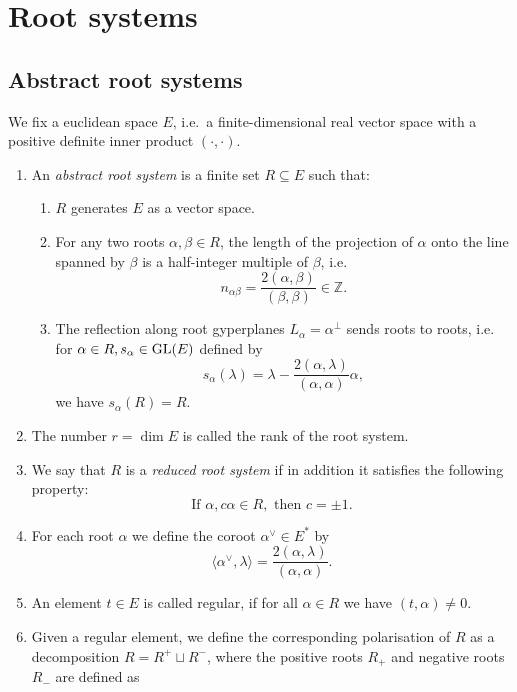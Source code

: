 \documentclass{report}
\begin{document}
\chapter{Root systems}
\section{Abstract root systems}
We fix a euclidean space $E$, i.e.\ a finite-dimensional real vector space with a positive definite inner product $(\cdot, \cdot)$.
\begin{definition}
    \begin{enumerate}
        \item An \emph{abstract root system} is a finite set $R \subseteq E$ such that:
        \begin{enumerate}[label = (\roman*)]
            \item $R$ generates $E$ as a vector space.
            \item For any two roots $\alpha, \beta \in R$, the length of the projection of $\alpha$ onto the line spanned by $\beta$ is a half-integer multiple of $\beta$, i.e.
            \[
            n_{\alpha \beta} = \frac{2(\alpha, \beta)}{(\beta, \beta)} \in \mathbb Z.
            \]
            \item The reflection along root gyperplanes $L_\alpha = \alpha^\perp$ sends roots to roots, i.e. for $\alpha \in R, s_\alpha \in \operatorname{{\mathrm{GL}}}(E)$ defined by
            \[
            s_{\alpha}(\lambda) = \lambda - \frac{2(\alpha, \lambda)}{(\alpha, \alpha)} \alpha,
            \]
            we have $s_\alpha(R) = R$.
        \end{enumerate}
        \item The number $r = \dim E$ is called the rank of the root system.
        \item We say that $R$ is a \emph{reduced root system} if in addition it satisfies the following property:
        \[ \text{If } \alpha, c \alpha \in R, \text{ then } c = \pm 1.\]
        \item For each root $\alpha$ we define the coroot $\alpha^\vee \in E^*$ by 
        \[
        \langle \alpha^\vee, \lambda \rangle = \frac{2(\alpha, \lambda)}{(\alpha, \alpha)}.
        \]
        \item An element $t \in E$ is called regular, if for all $\alpha \in R$ we have $(t, \alpha) \neq 0$.
        \item Given a regular element, we define the corresponding polarisation of $R$ as a decomposition $R = R^+ \sqcup R^-$, where the positive roots $R_+$ and negative roots $R_-$ are defined as

\end{enumerate}
\end{definition}
\end{document}
